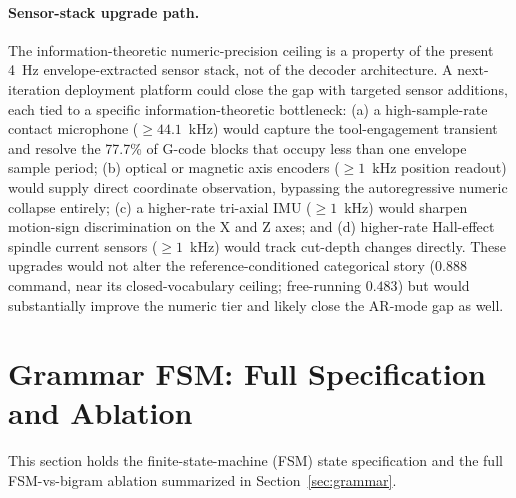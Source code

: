 \documentclass[11pt,a4paper]{article}
\begin{document}
\paragraph{Sensor-stack upgrade path.} The information-theoretic numeric-precision ceiling is a property of the present 4~Hz envelope-extracted sensor stack, not of the decoder architecture. A next-iteration deployment platform could close the gap with targeted sensor additions, each tied to a specific information-theoretic bottleneck: (a) a high-sample-rate contact microphone ($\geq 44.1$~kHz) would capture the tool-engagement transient and resolve the 77.7\% of G-code blocks that occupy less than one envelope sample period; (b) optical or magnetic axis encoders ($\geq 1$~kHz position readout) would supply direct coordinate observation, bypassing the autoregressive numeric collapse entirely; (c) a higher-rate tri-axial IMU ($\geq 1$~kHz) would sharpen motion-sign discrimination on the X and Z axes; and (d) higher-rate Hall-effect spindle current sensors ($\geq 1$~kHz) would track cut-depth changes directly. These upgrades would not alter the reference-conditioned categorical story ($0.888$ command, near its closed-vocabulary ceiling; free-running $0.483$) but would substantially improve the numeric tier and likely close the AR-mode gap as well.

\section{Grammar FSM: Full Specification and Ablation}
\label{app:fsm-detail}

This section holds the finite-state-machine (FSM) state specification and the
full FSM-vs-bigram ablation summarized in Section~\ref{sec:grammar}.
\end{document}
